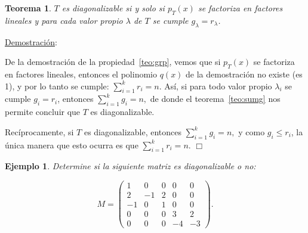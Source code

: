 \documentclass[12pt]{book}
\newtheorem{teo}{Teorema}
\newtheorem{ejem}{Ejemplo}
\begin{document}
{\begin{teo}\label{teo:g=r}
$T$ es diagonalizable si y solo si $p_T(x)$ se factoriza en factores lineales y para cada valor propio $\lambda$ de $T$ se cumple $g_\lambda=r_\lambda$.
\end{teo}
 \underline{Demostración}: {
 De la demostración de la propiedad~\ref{teo:grp}, vemos que si $p_T(x)$ se factoriza en factores lineales, entonces el polinomio $q(x)$ de la demostración no existe (es 1), y por lo tanto se cumple:
  $\sum_{i=1}^k r_i=n.$
Así, si para todo valor propio $\lambda_i$ se cumple $g_i=r_i$, entonces 
  $\sum_{i=1}^k g_i=n,$
  de donde el teorema~\ref{teo:sumg} nos permite concluir que $T$ es diagonalizable.
  
  Recíprocamente, si $T$ es diagonalizable, entonces $\sum_{i=1}^k g_i=n,$ y como $g_i\le r_i$, la única manera que esto ocurra es que $\sum_{i=1}^k r_i=n.$
   \hfill $\Box$
}

\begin{ejem} {\em Determine si la siguiente matriz es diagonalizable o no:

$$M=\left(\begin{matrix}1 & 0 & 0 & 0 & 0 \\ 2 & -1 & 2 & 0 & 0 \\ -1 & 0 & 1 & 0 & 0 \\ 0 & 0 & 0 & 3 & 2 \\ 0 & 0 & 0 & -4 & -3 \end{matrix}\right).$$

}
\end{ejem}}
\end{document}
